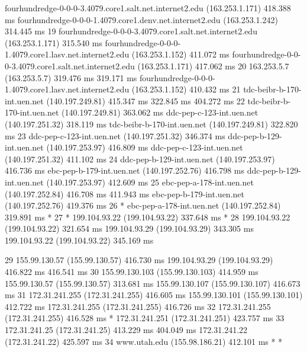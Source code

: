 \documentclass{article}
\begin{document}
\begin{enumerate}[a.]
\begin{code}
    fourhundredge-0-0-0-3.4079.core1.salt.net.internet2.edu (163.253.1.171)  418.388 ms
    fourhundredge-0-0-0-1.4079.core1.denv.net.internet2.edu (163.253.1.242)  314.445 ms
19  fourhundredge-0-0-0-3.4079.core1.salt.net.internet2.edu (163.253.1.171)  315.540 ms
    fourhundredge-0-0-0-1.4079.core1.lasv.net.internet2.edu (163.253.1.152)  411.072 ms
    fourhundredge-0-0-0-3.4079.core1.salt.net.internet2.edu (163.253.1.171)  417.062 ms
20  163.253.5.7 (163.253.5.7)  319.476 ms  319.171 ms
    fourhundredge-0-0-0-1.4079.core1.lasv.net.internet2.edu (163.253.1.152)  410.432 ms
21  tdc-beibr-b-170-int.uen.net (140.197.249.81)  415.347 ms  322.845 ms  404.272 ms
22  tdc-beibr-b-170-int.uen.net (140.197.249.81)  363.062 ms
    ddc-pep-c-123-int.uen.net (140.197.251.32)  318.119 ms
    tdc-beibr-b-170-int.uen.net (140.197.249.81)  322.820 ms
23  ddc-pep-c-123-int.uen.net (140.197.251.32)  346.374 ms
    ddc-pep-b-129-int.uen.net (140.197.253.97)  416.809 ms
    ddc-pep-c-123-int.uen.net (140.197.251.32)  411.102 ms
24  ddc-pep-b-129-int.uen.net (140.197.253.97)  416.736 ms
    ebc-pep-b-179-int.uen.net (140.197.252.76)  416.798 ms
    ddc-pep-b-129-int.uen.net (140.197.253.97)  412.609 ms
25  ebc-pep-a-178-int.uen.net (140.197.252.84)  416.708 ms  411.943 ms
    ebc-pep-b-179-int.uen.net (140.197.252.76)  419.376 ms
26  * ebc-pep-a-178-int.uen.net (140.197.252.84)  319.891 ms *
27  * 199.104.93.22 (199.104.93.22)  337.648 ms *
28  199.104.93.22 (199.104.93.22)  321.654 ms
    199.104.93.29 (199.104.93.29)  343.305 ms
    199.104.93.22 (199.104.93.22)  345.169 ms
\end{code}
\begin{code}
29  155.99.130.57 (155.99.130.57)  416.730 ms
    199.104.93.29 (199.104.93.29)  416.822 ms  416.541 ms
30  155.99.130.103 (155.99.130.103)  414.959 ms
    155.99.130.57 (155.99.130.57)  313.681 ms
    155.99.130.107 (155.99.130.107)  416.673 ms
31  172.31.241.255 (172.31.241.255)  416.605 ms
    155.99.130.101 (155.99.130.101)  412.722 ms
    172.31.241.255 (172.31.241.255)  416.726 ms
32  172.31.241.255 (172.31.241.255)  416.528 ms *
    172.31.241.251 (172.31.241.251)  423.757 ms
33  172.31.241.25 (172.31.241.25)  413.229 ms  404.049 ms
    172.31.241.22 (172.31.241.22)  425.597 ms
34  www.utah.edu (155.98.186.21)  412.101 ms * *
\end{code}


\end{enumerate}
\end{document}
